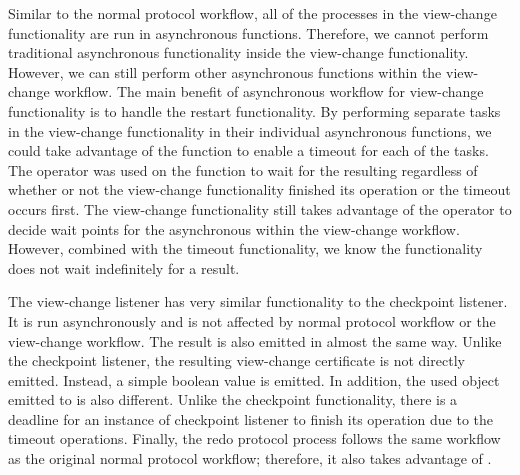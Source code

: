 Similar to the normal protocol workflow, all of the processes in the view-change functionality are run in  asynchronous functions. Therefore, we cannot perform traditional asynchronous functionality inside the view-change functionality. However, we can still perform other asynchronous  functions within the view-change workflow. 
The main benefit of asynchronous workflow for view-change functionality is to handle the restart functionality. By performing separate tasks in the view-change functionality in their individual asynchronous functions, we could take advantage of the  function to enable a timeout for each of the tasks.  The  operator was used on the  function to wait for the resulting  regardless of whether or not the view-change functionality finished its operation or the timeout occurs first. The view-change functionality still takes advantage of the  operator to decide wait points for the asynchronous  within the view-change workflow. However, combined with the timeout functionality, we know the functionality does not wait indefinitely for a result. 

The view-change listener has very similar functionality to the checkpoint listener. It is run asynchronously and is not affected by normal protocol workflow or the view-change workflow. The result is also emitted in almost the same way. Unlike the checkpoint listener, the resulting view-change certificate is not directly emitted. Instead, a simple boolean value is emitted. In addition, the used  object emitted to is also different. Unlike the checkpoint functionality, there is a deadline for an instance of checkpoint listener to finish its operation due to the timeout operations. Finally, the redo protocol process follows the same workflow as the original normal protocol workflow; therefore, it also takes advantage of .

